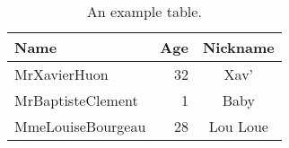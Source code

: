 \begin{table}
	\begin{center}
		\begin{tabular}{l|r|c}
			Name & Age & Nickname \\
			\hline
			MrXavierHuon & 32 & Xav' \\
			MrBaptisteClement & 1 & Baby \\
			MmeLouiseBourgeau & 28 & Lou Loue \\
		\end{tabular}
	\end{center}
	\caption{An example table.}
	\label{table:example_table}
\end{table}